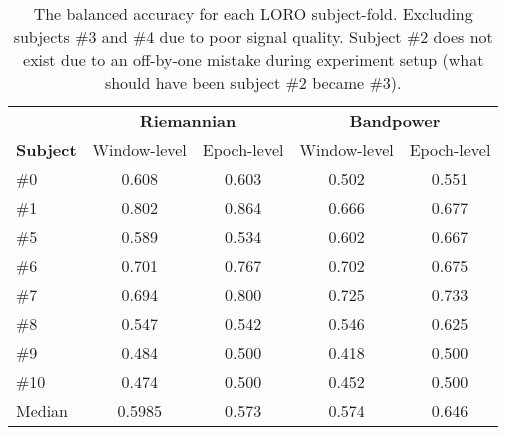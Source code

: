 \begin{table}[h]
    \centering
    \begin{tabular}{lcccc}
        \toprule
        & \multicolumn{2}{c}{\textbf{Riemannian}} & \multicolumn{2}{c}{\textbf{Bandpower}} \\
        \cmidrule(lr){2-3}
        \cmidrule(lr){4-5}
        \textbf{Subject} & Window-level & Epoch-level & Window-level & Epoch-level \\
        \midrule
        \#0  & 0.608 & 0.603 & 0.502 & 0.551 \\
        \#1  & 0.802 & 0.864 & 0.666 & 0.677 \\
        \#5  & 0.589 & 0.534 & 0.602 & 0.667 \\
        \#6  & 0.701 & 0.767 & 0.702 & 0.675 \\
        \#7  & 0.694 & 0.800 & 0.725 & 0.733 \\
        \#8  & 0.547 & 0.542 & 0.546 & 0.625 \\
        \#9  & 0.484 & 0.500 & 0.418 & 0.500 \\
        \#10 & 0.474 & 0.500 & 0.452 & 0.500 \\
        \midrule
        Median & 0.5985 & 0.573 & 0.574 & 0.646 \\
        \bottomrule
    \end{tabular}
    \caption{The balanced accuracy for each LORO subject-fold. Excluding subjects \#3 and \#4 due to poor signal quality. Subject \#2 does not exist due to an off-by-one mistake during experiment setup (what should have been subject \#2 became \#3).}\label{table:bac-all}
\end{table}
